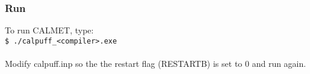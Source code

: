 \documentclass[10pt,a4paper]{article}
\newcommand\tab[1][0.5cm]{\hspace*{#1}}
\begin{document}
\begin{itemize}
\begin{itemize}
\end{itemize}
\end{itemize}

\subsubsection{Run}
To run CALMET, type:\\
\tab \texttt{\$ ./calpuff\_<compiler>.exe}\\\\
Modify calpuff.inp so the the restart flag (RESTARTB) is set to 0 and run again.
\end{document}
